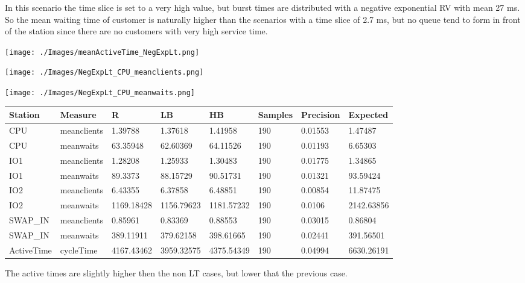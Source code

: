 \documentclass[12pt,a4paper]{article}
\begin{document}
In this scenario the time slice is set to a very high value, but burst times are distributed with a negative exponential RV with mean 27 ms. So the mean waiting time of customer is naturally higher than the scenarios with a time slice of 2.7 ms, but no queue tend to form in front of the station since there are no customers with very high service time.

\texttt{[image: ./Images/meanActiveTime\_NegExpLt.png]}

\texttt{[image: ./Images/NegExpLt\_CPU\_meanclients.png]}

\texttt{[image: ./Images/NegExpLt\_CPU\_meanwaits.png]}


\begin{table}[!ht]
    \centering
    \begin{tabular}{|l|l|l|l|l|l|l|l|}
    \hline
        Station & Measure & R & LB & HB & Samples & Precision & Expected \\ \hline
        CPU & meanclients & 1.39788 & 1.37618 & 1.41958 & 190 & 0.01553 & 1.47487 \\ \hline
        CPU & meanwaits & 63.35948 & 62.60369 & 64.11526 & 190 & 0.01193 & 6.65303 \\ \hline
        IO1 & meanclients & 1.28208 & 1.25933 & 1.30483 & 190 & 0.01775 & 1.34865 \\ \hline
        IO1 & meanwaits & 89.3373 & 88.15729 & 90.51731 & 190 & 0.01321 & 93.59424 \\ \hline
        IO2 & meanclients & 6.43355 & 6.37858 & 6.48851 & 190 & 0.00854 & 11.87475 \\ \hline
        IO2 & meanwaits & 1169.18428 & 1156.79623 & 1181.57232 & 190 & 0.0106 & 2142.63856 \\ \hline
        SWAP\_IN & meanclients & 0.85961 & 0.83369 & 0.88553 & 190 & 0.03015 & 0.86804 \\ \hline
        SWAP\_IN & meanwaits & 389.11911 & 379.62158 & 398.61665 & 190 & 0.02441 & 391.56501 \\ \hline
        ActiveTime & cycleTime & 4167.43462 & 3959.32575 & 4375.54349 & 190 & 0.04994 & 6630.26191 \\ \hline
    \end{tabular}
\end{table}

The active times are slightly higher then the non LT cases, but lower that the previous case.
\end{document}
